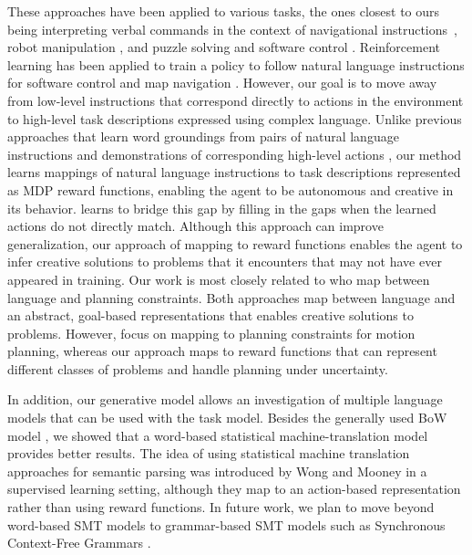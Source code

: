 \documentclass[conference]{IEEEtran}
\begin{document}
These approaches have been applied to various tasks, the ones  closest to ours being interpreting verbal commands in the context of navigational instructions~\cite{vogel10,chen11,grubb11}, robot manipulation \cite{duvallet2013,tellex14,howard14},
and puzzle solving and software control \cite{bkr10}.
 Reinforcement learning has been applied to train a policy to follow natural language instructions for software control
and map navigation \cite{vogel10}. However, our goal is to move away from low-level instructions that correspond directly to actions in the environment
to high-level task descriptions expressed using complex language.
Unlike previous approaches that learn word groundings from pairs of
natural language instructions and demonstrations of corresponding high-level
actions \cite{tellex14,duvallet2013}, our method learns mappings
of natural language instructions to task descriptions represented as
MDP reward functions, enabling the agent to be autonomous and creative
in its behavior.  \citet{misra14} learns to bridge this gap by filling
in the gaps when the learned actions do not directly match.  Although
this approach can improve generalization, our approach of mapping to
reward functions enables the agent to infer creative solutions to
problems that it encounters that may not have ever appeared in
training.  Our work is most closely related to \citet{howard14} who
map between language and planning constraints.  Both approaches map
between language and an abstract, goal-based representations that
enables creative solutions to problems. However, \citet{howard14}
focus on mapping to planning constraints for motion planning, whereas our 
approach maps to reward functions that can represent different classes
of problems and handle planning under uncertainty.

In addition, our generative model allows an investigation of multiple
language models that can be used with the task model. Besides the
generally used BoW model \cite{bkr09,vogel10}, we showed that
a word-based statistical machine-translation model provides better
results. The idea of using statistical machine translation approaches
for semantic parsing was introduced by Wong and Mooney \cite{wong07}
in a supervised learning setting, although they map to an action-based
representation rather than using reward functions. In future work, we
plan to move beyond word-based SMT models to grammar-based SMT models
such as Synchronous Context-Free Grammars \cite{Wu1997}.
\end{document}
